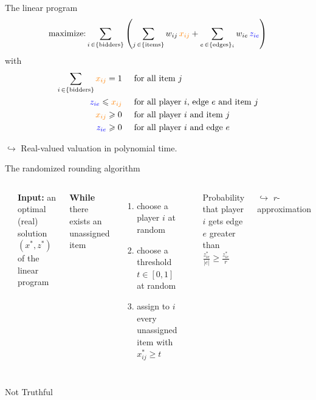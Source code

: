 \documentclass[aspectratio=169]{beamer}
\begin{document}
\begin{frame}{The linear program}
    \[
        \text{maximize:} \sum_{i \,\in \{\text{bidders}\}} \left(
        \sum_{j \,\in \{\text{items}\}} w_{ij}\, {\color{orange} x_{ij}}
        + \sum_{e \,\in \{\text{edges}\}_i} w_{ie}\, {\color{blue} z_{ie}}
        \right)
    \]
    with
    \begin{align*}
        \sum_{i \,\in \{\text{bidders}\}} {\color{orange} x_{ij}} = 1 & \hspace{.5cm} \text{for all item \(j\)}                              \\
        {\color{blue} z_{ie}} \leqslant {\color{orange} x_{ij}}       & \hspace{.5cm} \text{for all player \(i\), edge \(e\) and item \(j\)} \\
        {\color{orange} x_{ij}} \geqslant 0                           & \hspace{.5cm} \text{for all player \(i\) and item \(j\)}             \\
        {\color{blue} z_{ie}} \geqslant 0                             & \hspace{.5cm} \text{for all player \(i\) and edge \(e\)}
    \end{align*}

    $\hookrightarrow$ Real-valued valuation in \alert{polynomial time}.
\end{frame}

\begin{frame}{The randomized rounding algorithm}
    \begin{columns}
        \hrule
        \vspace{.1cm}
        \textbf{Input:} an optimal (real) solution \((x^*, z^*)\) of the linear program

        \vspace{.65cm}
        \textbf{While} there exists an unassigned item
        \begin{enumerate}
            \item choose a player \(i\) at random
            \item choose a threshold \(t \in [0, 1]\) at random
            \item assign to \(i\) every unassigned item with \(x_{ij}^* \geqslant t\)
        \end{enumerate}
        \hrule

        Probability that player \(i\) gets edge \(e\) greater than \(\frac{z_{ie}^*}{|e|} \geqslant \frac{z_{ie}^*}{r}\)

        \(\hookrightarrow\) \(r\)-approximation

    \end{columns}
    \pause
    \begin{center}
        \alert<2>{Not Truthful}
    \end{center}
\end{frame}
\end{document}
